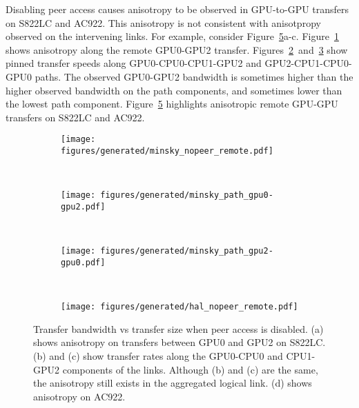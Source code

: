 Disabling peer access causes anisotropy to be observed in GPU-to-GPU transfers on S822LC and AC922.
This anisotropy is not consistent with anisotpropy observed on the intervening links.
For example, consider Figure~\ref{fig:explicit-peer-anisotropy}a-c.
Figure~\ref{fig:minsky-explicit-nopeer-remote} shows anisotropy along the remote GPU0-GPU2 transfer.
Figures~\ref{fig:minsky-explicit-path-gpu0-gpu2}~and~\ref{fig:minsky-explicit-path-gpu2-gpu0} show pinned transfer speeds along GPU0-CPU0-CPU1-GPU2 and GPU2-CPU1-CPU0-GPU0 paths.
The observed GPU0-GPU2 bandwidth is sometimes higher than the higher observed bandwidth on the path components, and sometimes lower than the lowest path component.
Figure~\ref{fig:explicit-peer-anisotropy} highlights anisotropic remote GPU-GPU transfers on S822LC and AC922.

\begin{figure}[ht]
    \centering
    \begin{subfigure}[b]{0.3\textwidth}
        \texttt{[image: figures/generated/minsky\_nopeer\_remote.pdf]}
        \caption{}
        \label{fig:minsky-explicit-nopeer-remote}
    \end{subfigure}
    ~
    \begin{subfigure}[b]{0.3\textwidth}
        \texttt{[image: figures/generated/minsky\_path\_gpu0-gpu2.pdf]}
        \caption{}
        \label{fig:minsky-explicit-path-gpu0-gpu2}
    \end{subfigure}
    ~
    \begin{subfigure}[b]{0.3\textwidth}
        \texttt{[image: figures/generated/minsky\_path\_gpu2-gpu0.pdf]}
        \caption{}
        \label{fig:minsky-explicit-path-gpu2-gpu0}
    \end{subfigure}
    \\
    \begin{subfigure}[b]{0.3\textwidth}
        \texttt{[image: figures/generated/hal\_nopeer\_remote.pdf]}
        \caption{}
        \label{fig:}
    \end{subfigure}
    \caption[]{
        Transfer bandwidth vs transfer size when peer access is disabled.
        (a) shows anisotropy on transfers between GPU0 and GPU2 on S822LC.
        (b) and (c) show transfer rates along the GPU0-CPU0 and CPU1-GPU2 components of the links.
        Although (b) and (c) are the same, the anisotropy still exists in the aggregated logical link.
        (d) shows anisotropy on AC922.
    }
    \label{fig:explicit-peer-anisotropy}
\end{figure}

